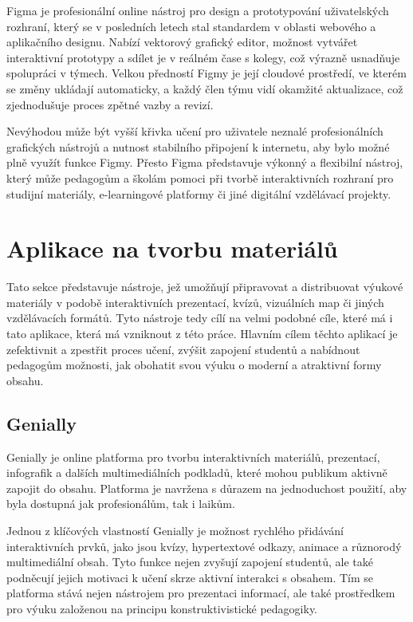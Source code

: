 Figma je profesionální online nástroj pro design a prototypování uživatelských rozhraní, který se v posledních letech stal standardem v oblasti webového a aplikačního designu. 
Nabízí vektorový grafický editor, možnost vytvářet interaktivní prototypy a sdílet je v reálném čase s kolegy, což výrazně usnadňuje spolupráci v týmech. 
Velkou předností Figmy je její cloudové prostředí, ve kterém se změny ukládají automaticky, a každý člen týmu vidí okamžité aktualizace, což zjednodušuje proces zpětné vazby a revizí. 

Nevýhodou může být vyšší křivka učení pro uživatele neznalé profesionálních grafických nástrojů a nutnost stabilního připojení k internetu, aby bylo možné plně využít funkce Figmy. 
Přesto Figma představuje výkonný a flexibilní nástroj, který může pedagogům a školám pomoci při tvorbě interaktivních rozhraní pro studijní materiály, e-learningové platformy či jiné digitální vzdělávací projekty.

\section{Aplikace na tvorbu materiálů}

Tato sekce představuje nástroje, jež umožňují připravovat a distribuovat výukové materiály v podobě interaktivních prezentací, kvízů, vizuálních map či jiných vzdělávacích formátů.
Tyto nástroje tedy cílí na velmi podobné cíle, které má i tato aplikace, která má vzniknout z této práce.
Hlavním cílem těchto aplikací je zefektivnit a zpestřit proces učení, zvýšit zapojení studentů a nabídnout pedagogům možnosti, jak obohatit svou výuku o moderní a atraktivní formy obsahu.

\subsection{Genially}

Genially je online platforma pro tvorbu interaktivních materiálů, prezentací, infografik a dalších multimediálních podkladů, které mohou publikum aktivně zapojit do obsahu.
Platforma je navržena s důrazem na jednoduchost použití, aby byla dostupná jak profesionálům, tak i laikům.

Jednou z klíčových vlastností Genially je možnost rychlého přidávání interaktivních prvků, jako jsou kvízy, hypertextové odkazy, animace a různorodý multimediální obsah. 
Tyto funkce nejen zvyšují zapojení studentů, ale také podněcují jejich motivaci k učení skrze aktivní interakci s obsahem. 
Tím se platforma stává nejen nástrojem pro prezentaci informací, ale také prostředkem pro výuku založenou na principu konstruktivistické pedagogiky. 

